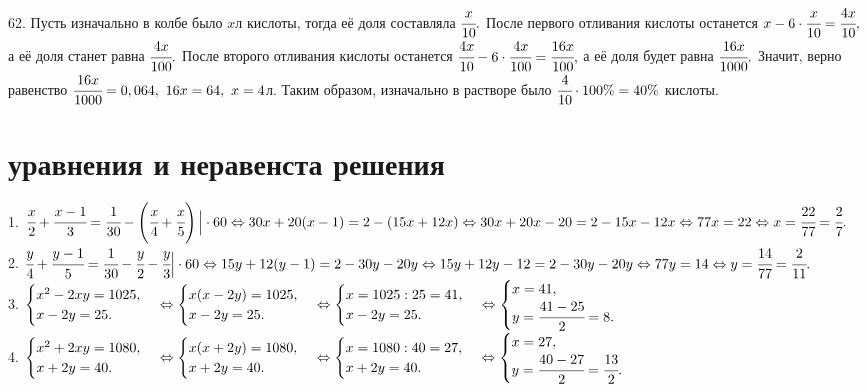 \documentclass[12pt]{article}
\begin{document}
62. Пусть изначально в колбе было $x$л кислоты, тогда её доля составляла $\cfrac{x}{10}.$ После первого отливания кислоты останется $x-6\cdot\cfrac{x}{10}=\cfrac{4x}{10},$ а её доля станет равна $\cfrac{4x}{100}.$ После второго отливания кислоты останется $\cfrac{4x}{10}-6\cdot\cfrac{4x}{100}=\cfrac{16x}{100},$ а её доля будет равна $\cfrac{16x}{1000}.$ Значит, верно равенство $\cfrac{16x}{1000}=0,064,\ 16x=64,\ x=4$л. Таким образом, изначально в растворе было $\cfrac{4}{10}\cdot100\%=40\%$ кислоты.
\newpage
\section{уравнения и неравенста решения}
1. $\cfrac{x}{2}+\cfrac{x-1}{3}=\cfrac{1}{30}-\left(\cfrac{x}{4}+\cfrac{x}{5}\right)\Big|\cdot60\Leftrightarrow30x+20(x-1)=2-(15x+12x)\Leftrightarrow30x+20x-20=2-15x-12x
\Leftrightarrow77x=22\Leftrightarrow x=\cfrac{22}{77}=\cfrac{2}{7}.$\\
2. $\cfrac{y}{4}+\cfrac{y-1}{5}=\cfrac{1}{30}-\cfrac{y}{2}-\cfrac{y}{3}\Big|\cdot60\Leftrightarrow15y+12(y-1)=2-30y-20y\Leftrightarrow15y+12y-12=2-30y-20y
\Leftrightarrow77y=14\Leftrightarrow y=\cfrac{14}{77}=\cfrac{2}{11}.$\\
3. $\begin{cases} x^2-2xy=1025,\\x-2y=25.\end{cases}\Leftrightarrow\begin{cases} x(x-2y)=1025,\\x-2y=25.\end{cases}
\Leftrightarrow\begin{cases} x=1025:25=41,\\x-2y=25.\end{cases}\Leftrightarrow\begin{cases} x=41,\\y=\cfrac{41-25}{2}=8.\end{cases}$\\
4. $\begin{cases} x^2+2xy=1080,\\x+2y=40.\end{cases}\Leftrightarrow\begin{cases} x(x+2y)=1080,\\x+2y=40.\end{cases}\Leftrightarrow\begin{cases} x=1080:40=27,\\x+2y=40.\end{cases}\Leftrightarrow\begin{cases} x=27,\\y=\cfrac{40-27}{2}=\cfrac{13}{2}.\end{cases}$\\
\end{document}
